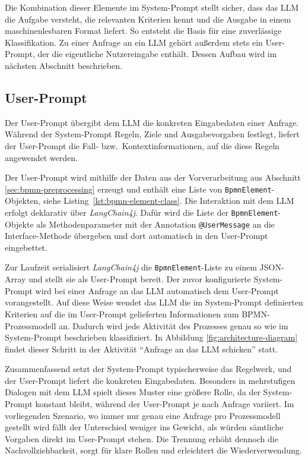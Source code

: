 Die Kombination dieser Elemente im System-Prompt stellt sicher, dass das \ac{LLM} die Aufgabe versteht, die relevanten Kriterien kennt und die Ausgabe in einem maschinenlesbaren Format liefert. So entsteht die Basis für eine zuverlässige Klassifikation. Zu einer Anfrage an ein \ac{LLM} gehört außerdem stets ein User-Prompt, der die eigentliche Nutzereingabe enthält. Dessen Aufbau wird im nächsten Abschnitt beschrieben.

\subsection*{User-Prompt}

Der User-Prompt übergibt dem \ac{LLM} die konkreten Eingabedaten einer Anfrage. Während der System-Prompt Regeln, Ziele und Ausgabevorgaben festlegt, liefert der User-Prompt die Fall- bzw.\ Kontextinformationen, auf die diese Regeln angewendet werden.

Der User-Prompt wird mithilfe der Daten aus der Vorverarbeitung aus Abschnitt \ref{sec:bpmn-preprocessing} erzeugt und enthält eine Liste von \texttt{BpmnElement}-Objekten, siehe Listing~\ref{lst:bpmn-element-class}. Die Interaktion mit dem \ac{LLM} erfolgt deklarativ über \emph{LangChain4j}. Dafür wird die Liste der \texttt{BpmnElement}-Objekte als Methodenparameter mit der Annotation \texttt{@UserMessage} an die Interface-Methode übergeben und dort automatisch in den User-Prompt eingebettet.

Zur Laufzeit serialisiert \emph{LangChain4j} die \texttt{BpmnElement}-Liste zu einem JSON-Array und stellt sie als User-Prompt bereit. Der zuvor konfigurierte System-Prompt wird bei einer Anfrage an das \ac{LLM} automatisch dem User-Prompt vorangestellt. Auf diese Weise wendet das \ac{LLM} die im System-Prompt definierten Kriterien auf die im User-Prompt gelieferten Informationen zum \ac{BPMN}-Prozessmodell an. Dadurch wird jede Aktivität des Prozesses genau so wie im System-Prompt beschrieben klassifiziert. In Abbildung \ref{fig:architecture-diagram} findet dieser Schritt in der Aktivität \enquote{Anfrage an das LLM schicken} statt.

Zusammenfassend setzt der System-Prompt typischerweise das Regelwerk, und der User-Prompt liefert die konkreten Eingabedaten. Besonders in mehrstufigen Dialogen mit dem \ac{LLM} spielt dieses Muster eine größere Rolle, da der System-Prompt konstant bleibt, während der User-Prompt je nach Anfrage variiert. Im vorliegenden Szenario, wo immer nur genau eine Anfrage pro Prozessmodell gestellt wird fällt der Unterschied weniger ins Gewicht, als würden sämtliche Vorgaben direkt im User-Prompt stehen. Die Trennung erhöht dennoch die Nachvollziehbarkeit, sorgt für klare Rollen und erleichtert die Wiederverwendung.

